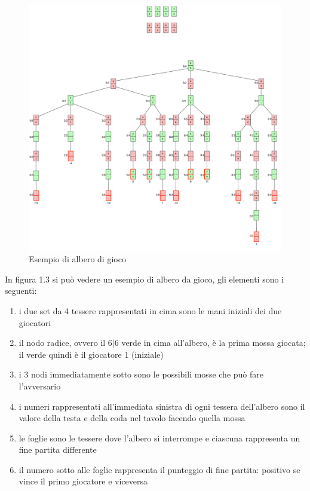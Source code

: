 \documentclass[a4paper,12pt]{report}
\begin{document}
\begin{figure}[h!]
    \centering
    \includegraphics[width=1\textwidth]{imgs/gametree.png} 
    \caption{Esempio di albero di gioco}
    \label{fig:etichetta}
\end{figure}

In figura 1.3 si può vedere un esempio di albero da gioco, gli elementi sono i seguenti:

\begin{enumerate}
    \item i due set da 4 tessere rappresentati in cima sono le mani iniziali dei due giocatori
    \item il nodo radice, ovvero il \(6|6\) verde in cima all'albero, è la prima mossa giocata; il verde quindi è il giocatore 1 (iniziale)
    \item i 3 nodi immediatamente sotto sono le possibili mosse che può fare l'avversario
    \item i numeri rappresentati all'immediata sinistra di ogni tessera dell'albero sono il valore della testa e della coda nel tavolo facendo quella mossa
    \item le foglie sono le tessere dove l'albero si interrompe e ciascuna rappresenta un fine partita differente
    \item il numero sotto alle foglie rappresenta il punteggio di fine partita: positivo se vince il primo giocatore e viceversa  
\end{enumerate}
\end{document}
